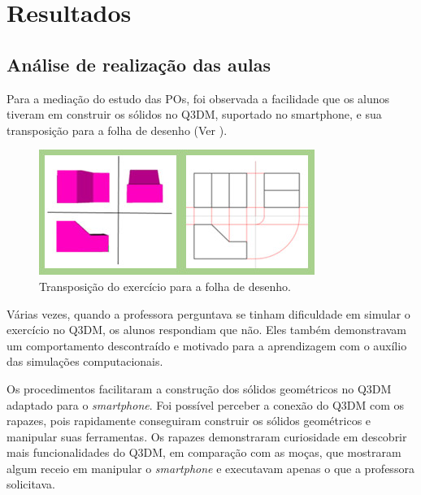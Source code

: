 \section{Resultados}\label{sec-resultados}
\subsection{Análise de realização das aulas}\label{sub-sec-análisederealizaçãodasaulas}

Para a mediação do estudo das POs, foi observada a facilidade que os
alunos tiveram em construir os sólidos no Q3DM, suportado no smartphone,
e sua transposição para a folha de desenho (Ver ).

\begin{figure}[htpb]
\centering
\begin{minipage}{.5\textwidth}
\includegraphics[width=\textwidth]{figures/figure07.jpg}
\caption{Transposição do exercício para a folha de desenho.}
\label{fig-07}
\end{minipage}
\end{figure}

Várias vezes, quando a professora perguntava se tinham dificuldade em
simular o exercício no Q3DM, os alunos respondiam que não. Eles também
demonstravam um comportamento descontraído e motivado para a
aprendizagem com o auxílio das simulações computacionais.

Os procedimentos facilitaram a construção dos sólidos geométricos no
Q3DM adaptado para o \textit{smartphone}. Foi possível perceber a conexão do Q3DM
com os rapazes, pois rapidamente conseguiram construir os sólidos
geométricos e manipular suas ferramentas. Os rapazes demonstraram
curiosidade em descobrir mais funcionalidades do Q3DM, em comparação com
as moças, que mostraram algum receio em manipular o \textit{smartphone} e
executavam apenas o que a professora solicitava.


